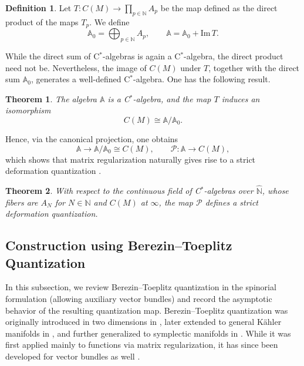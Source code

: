 \documentclass[12pt]{article}
\theoremstyle{definition} %
\newtheorem{definition}{Definition}
\theoremstyle{plain} %
\newtheorem{theorem}{Theorem}[section]
\theoremstyle{remark} %
\theoremstyle{underline}
\begin{document}
\begin{definition}
    Let $T:C(M)\to\prod_{p\in\mathbb{N}}A_p$ be the map defined as the direct product
    of the maps $T_p$.
    We define
    \[
        \mathbb{A}_0=\bigoplus_{p\in\mathbb{N}}A_p,
        \qquad
        \mathbb{A}=\mathbb{A}_0+\mathrm{Im}\,T.
    \]
\end{definition}

While the direct sum of C$^\ast$-algebras is again a C$^\ast$-algebra, the direct product need not be.
Nevertheless, the image of $C(M)$ under $T$, together with the direct sum $\mathbb{A}_0$, generates a well-defined C$^\ast$-algebra.
One has the following result.

\begin{theorem}
    The algebra $\mathbb{A}$ is a C$^\ast$-algebra, and the map $T$ induces an isomorphism
    \[
        C(M)\cong \mathbb{A}/\mathbb{A}_0.
    \]
\end{theorem}

Hence, via the canonical projection, one obtains
\[
    \mathbb{A}\longrightarrow \mathbb{A}/\mathbb{A}_0\cong C(M),
    \qquad
    \mathcal{P}:\mathbb{A}\to C(M),
\]
which shows that matrix regularization naturally gives rise to a strict deformation quantization \cite{hawkins1999quantization,hawkins2000geometric}.

\begin{theorem}
    With respect to the continuous field of C$^\ast$-algebras over
    $\hat{\mathbb{N}}$, whose fibers are $A_N$ for $N\in\mathbb{N}$ and $C(M)$ at $\infty$, the map $\mathcal{P}$ defines a strict deformation quantization.
\end{theorem}



\subsection{Construction using Berezin--Toeplitz Quantization}

In this subsection, we review Berezin--Toeplitz quantization in the spinorial formulation (allowing auxiliary vector bundles) and record the asymptotic behavior of the resulting quantization map.
Berezin--Toeplitz quantization was originally introduced in two dimensions in \cite{1992LMaPh..24..125K}, later extended to general K\"ahler manifolds in \cite{Bordemann:1993zv}, and further generalized to symplectic manifolds in \cite{ma2008toeplitz}.
While it was first applied mainly to functions via matrix regularization, it has since been developed for vector bundles as well \cite{hawkins2000geometric,Adachi:2021aux,Adachi:2021ljw,Adachi:2022mln,BTQtextbook,Adachi:2023dhc}.
\end{document}
